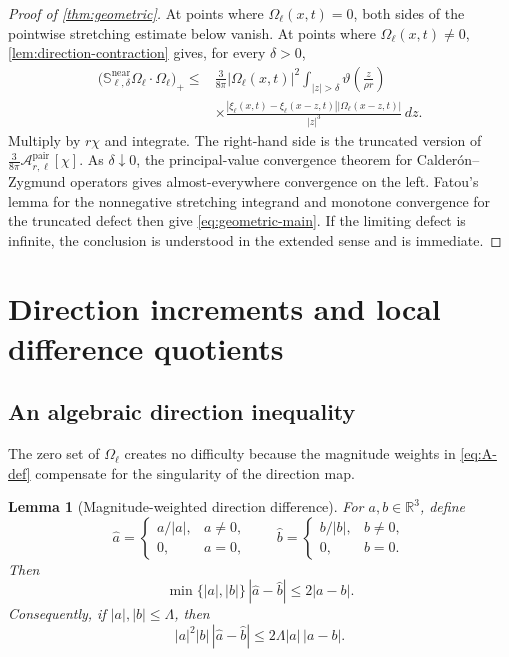 \documentclass[11pt]{article}
\numberwithin{equation}{section}
\theoremstyle{plain}
\newtheorem{lemma}[theorem]{Lemma}
\theoremstyle{definition}
\theoremstyle{remark}
\newcommand{\R}{\mathbb R}
\begin{document}
\begin{proof}[Proof of \cref{thm:geometric}]
At points where $\Omega_\ell(x,t)=0$, both sides of the pointwise stretching estimate below vanish. At points where $\Omega_\ell(x,t)\ne0$, \cref{lem:direction-contraction} gives, for every $\delta>0$,
\begin{align}
\bigl(
\mathbb S_{\ell,\delta}^{\mathrm{near}}\Omega_\ell\cdot\Omega_\ell
\bigr)_+
\le{}&
\frac{3}{8\pi}|\Omega_\ell(x,t)|^2
\int_{|z|>\delta}
\vartheta\!\left(\frac z{\rho r}\right)
\nonumber\\
&\times
\frac{
|\xi_\ell(x,t)-\xi_\ell(x-z,t)|
|\Omega_\ell(x-z,t)|
}{|z|^3}\,dz.
\label{eq:pointwise-geometric-truncated}
\end{align}
Multiply by $r\chi$ and integrate. The right-hand side is the truncated version of $\frac{3}{8\pi}\mathcal A_{r,\ell}^{\mathrm{pair}}[\chi]$. As $\delta\downarrow0$, the principal-value convergence theorem for Calder\'on--Zygmund operators gives almost-everywhere convergence on the left. Fatou's lemma for the nonnegative stretching integrand and monotone convergence for the truncated defect then give \eqref{eq:geometric-main}. If the limiting defect is infinite, the conclusion is understood in the extended sense and is immediate.
\end{proof}

\section{Direction increments and local difference quotients}\label{sec:difference}

\subsection{An algebraic direction inequality}

The zero set of $\Omega_\ell$ creates no difficulty because the magnitude weights in \eqref{eq:A-def} compensate for the singularity of the direction map.

\begin{lemma}[Magnitude-weighted direction difference]\label{lem:algebraic-direction}
For $a,b\in\R^3$, define
\[
\widehat a=
\begin{cases}a/|a|,&a\ne0,\\0,&a=0,\end{cases}
\qquad
\widehat b=
\begin{cases}b/|b|,&b\ne0,\\0,&b=0.\end{cases}
\]
Then
\begin{equation}\label{eq:min-direction}
\min\{|a|,|b|\}\,|\widehat a-\widehat b|
\le 2|a-b|.
\end{equation}
Consequently, if $|a|,|b|\le\Lambda$, then
\begin{equation}\label{eq:weighted-direction}
|a|^2|b|\,|\widehat a-\widehat b|
\le 2\Lambda|a|\,|a-b|.
\end{equation}
\end{lemma}
\end{document}
